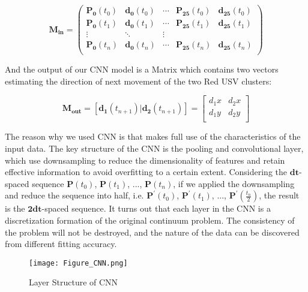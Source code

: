 \documentclass{mcmthesis}
\begin{document}
\begin{equation}
\mathbf{M_{in}} = 
  \begin{pmatrix}
  \mathbf{P_{0}}(t_0) & \mathbf{d_{0}}(t_0) & \cdots & \mathbf{P_{25}}(t_0) & \mathbf{d_{25}}(t_0)\\
  \mathbf{P_{0}}(t_1) & \mathbf{d_{0}}(t_1) & \cdots & \mathbf{P_{25}}(t_1) & \mathbf{d_{25}}(t_1) \\
  \vdots & \ddots & \vdots \\  
  \mathbf{P_{0}}(t_n) & \mathbf{d_{0}}(t_n) & \cdots & \mathbf{P_{25}}(t_n) & \mathbf{d_{25}}(t_n)  \\
  \end{pmatrix}
\end{equation}

And the output of our CNN model is a Matrix which contains two vectors estimating the direction of next movement of the two Red USV clusters:

\begin{equation}
\mathbf{M_{out}} = [\mathbf{d_{1}}(t_{n+1}) \vert \mathbf{d_{2}}(t_{n+1})] = 
  \begin{bmatrix}
  d_1x & d_2x\\
  d_1y & d_2y  \\
  \end{bmatrix}
\end{equation}

The reason why we used CNN is that makes full use of the characteristics of the input data. The key structure of the CNN is the pooling and convolutional layer, which use downsampling to reduce the dimensionality of features and retain effective information to avoid overfitting to a certain extent. Considering the $\mathbf{dt}$-spaced sequence $\mathbf{P}(t_0)$, $\mathbf{P}(t_1)$, ..., $\mathbf{P}(t_n)$, if we applied the downsampling and reduce the sequence into half, i.e. $\mathbf{P}^{'}(t_0)$, $\mathbf{P}^{'}(t_1)$, ..., $\mathbf{P}^{'}(\frac{t_n}{2})$, the result is the $\mathbf{2dt}$-spaced sequence. It turns out that each layer in the CNN is a discretization formation of the original continuum problem. The consistency of the problem will not be destroyed, and the nature of the data can be discovered from different fitting accuracy.

\begin{figure}[h]
\small
\centering
\texttt{[image: Figure\_CNN.png]}
\caption{Layer Structure of CNN} \label{fig:Layer Structure of CNN}
\end{figure}
\end{document}
